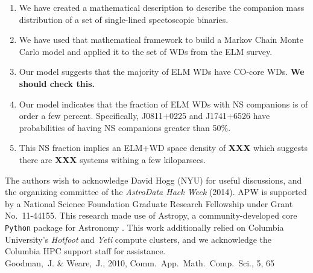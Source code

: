\documentclass[letterpaper,12pt,preprint]{aastex}
\begin{document}
\begin{enumerate}
\item We have created a mathematical description to describe the companion mass distribution of a set of single-lined spectoscopic binaries. \\
\item We have used that mathematical framework to build a Markov Chain Monte Carlo model and applied it to the set of WDs from the ELM survey. \\
\item Our model suggests that the majority of ELM WDs have CO-core WDs. {\bf We should check this.} \\
\item Our model indicates that the fraction of ELM WDs with NS companions is of order a few percent. Specifically, J0811$+$0225 and J1741$+$6526 have probabilities of having NS companions greater than 50\%. \\
\item This NS fraction implies an ELM+WD space density of {\bf XXX} which suggests there are {\bf XXX} systems withing a few kiloparsecs.
\end{enumerate}

\acknowledgements
The authors wish to acknowledge David Hogg (NYU) for useful discussions, and the organizing committee of the \emph{AstroData Hack Week} (2014). 
APW is supported by a National Science Foundation Graduate Research Fellowship under Grant No.\ 11-44155. 
This research made use of Astropy, a community-developed core \texttt{Python} package for Astronomy \citep{astropy13}.
This work additionally relied on Columbia University's \emph{Hotfoot} and \emph{Yeti} compute clusters, and we acknowledge the Columbia HPC support staff for assistance. \\




Goodman,~J. \& Weare,\ J.,
2010, Comm.\ App.\ Math.\ Comp.\ Sci., 5, 65
\end{document}
